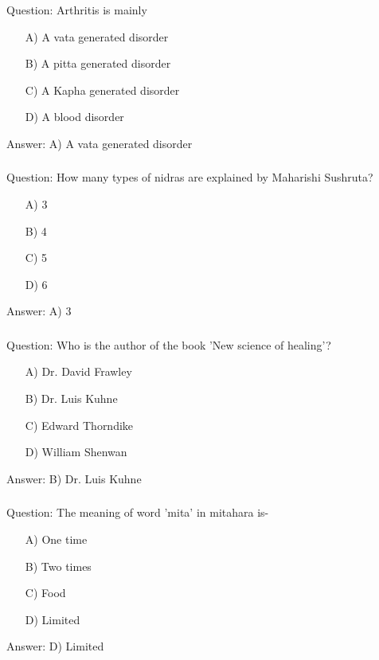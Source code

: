 \begin{frame}[fragile]\frametitle{}

Question: Arthritis is mainly

\begin{itemize}
\item[A)] A vata generated disorder
\item[B)] A pitta generated disorder
\item[C)] A Kapha generated disorder
\item[D)] A blood disorder
\end{itemize}

Answer: A) A vata generated disorder
\end{frame}

\begin{frame}[fragile]\frametitle{}

Question: How many types of nidras are explained by Maharishi Sushruta?

\begin{itemize}
\item[A)] 3
\item[B)] 4
\item[C)] 5
\item[D)] 6
\end{itemize}

Answer: A) 3
\end{frame}

\begin{frame}[fragile]\frametitle{}

Question: Who is the author of the book 'New science of healing'?

\begin{itemize}
\item[A)] Dr. David Frawley
\item[B)] Dr. Luis Kuhne
\item[C)] Edward Thorndike
\item[D)] William Shenwan
\end{itemize}

Answer: B) Dr. Luis Kuhne
\end{frame}

\begin{frame}[fragile]\frametitle{}

Question: The meaning of word 'mita' in mitahara is-

\begin{itemize}
\item[A)] One time
\item[B)] Two times
\item[C)] Food
\item[D)] Limited
\end{itemize}

Answer: D) Limited
\end{frame}

